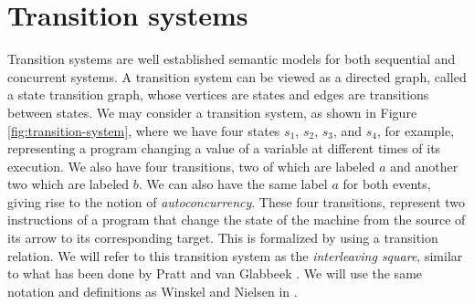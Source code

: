 \section{Transition systems}
\label{sec:ordinary-transition-systems}
    
    
    Transition systems are well established semantic models for both sequential and concurrent systems. A transition system can be viewed as a directed graph, called a state transition graph, whose vertices are states and edges are transitions between states. We may consider a transition system, as shown in Figure \ref{fig:transition-system}, where we have four states $s_{1}$, $s_{2}$, $s_{3}$, and $s_{4}$, for example, representing a program changing a value of a variable at different times of its execution. We also have four transitions, two of which are labeled $a$ and another two which are labeled $b$. We can also have the same label $a$ for both events, giving rise to the notion of \emph{autoconcurrency}. These four transitions, represent two instructions of a program that change the state of the machine from the source of its arrow to its corresponding target. This is formalized by using a transition relation. We will refer to this transition system as the \emph{interleaving square}, similar to what has been done by Pratt \cite{Pratt00Sculptures} and van Glabbeek \cite{Glabbeek06HDA}. We will use the same notation and definitions as Winskel and Nielsen in \cite{winskel95modelsCategory}.
    
